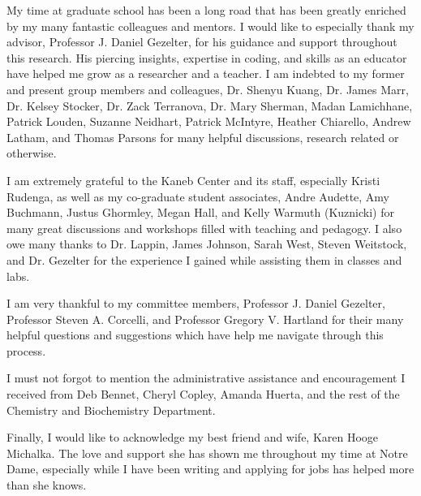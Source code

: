 \begin{acknowledge} 
My time at graduate school has been a long road that has been greatly enriched
by my many fantastic colleagues and mentors. I would like to especially thank
my advisor, Professor J. Daniel Gezelter, for his guidance and support
throughout this research. His piercing insights, expertise in coding, and
skills as an educator have helped me grow as a researcher and a teacher. I am
indebted to my former and present group members and colleagues, Dr. Shenyu
Kuang, Dr. James Marr, Dr.  Kelsey Stocker, Dr. Zack Terranova, Dr. Mary
Sherman, Madan Lamichhane, Patrick Louden, Suzanne Neidhart, Patrick McIntyre,
Heather Chiarello, Andrew Latham, and Thomas Parsons for many helpful
discussions, research related or otherwise.

I am extremely grateful to the Kaneb Center and its staff, especially Kristi
Rudenga, as well as my co-graduate student associates, Andre Audette, Amy
Buchmann, Justus Ghormley, Megan Hall, and Kelly Warmuth (Kuznicki) for many
great discussions and workshops filled with teaching and pedagogy. I also owe
many thanks to Dr. Lappin, James Johnson, Sarah West, Steven Weitstock, and Dr.
Gezelter for the experience I gained while assisting them in classes and labs.

I am very thankful to my committee members, Professor J. Daniel Gezelter,
Professor Steven A. Corcelli, and Professor Gregory V. Hartland for their many
helpful questions and suggestions which have help me navigate through this process. 

I must not forgot to mention the administrative assistance and encouragement I
received from Deb Bennet, Cheryl Copley, Amanda Huerta, and the rest of the
Chemistry and Biochemistry Department.

Finally, I would like to acknowledge my best friend and wife, Karen Hooge
Michalka. The love and support she has shown me throughout my time at Notre
Dame, especially while I have been writing and applying for jobs has helped
more than she knows.
\end{acknowledge}


